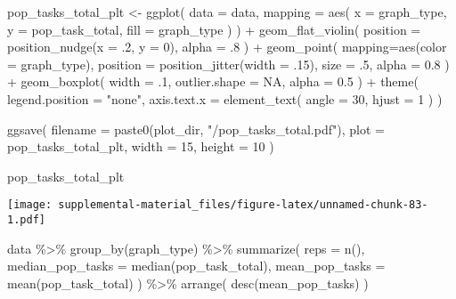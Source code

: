 \documentclass[
]{book}
\newenvironment{Shaded}{\begin{snugshade}}{\end{snugshade}}
\newcommand{\AttributeTok}[1]{\textcolor[rgb]{0.77,0.63,0.00}{#1}}
\newcommand{\ConstantTok}[1]{\textcolor[rgb]{0.00,0.00,0.00}{#1}}
\newcommand{\DecValTok}[1]{\textcolor[rgb]{0.00,0.00,0.81}{#1}}
\newcommand{\FloatTok}[1]{\textcolor[rgb]{0.00,0.00,0.81}{#1}}
\newcommand{\FunctionTok}[1]{\textcolor[rgb]{0.00,0.00,0.00}{#1}}
\newcommand{\NormalTok}[1]{#1}
\newcommand{\OtherTok}[1]{\textcolor[rgb]{0.56,0.35,0.01}{#1}}
\newcommand{\SpecialCharTok}[1]{\textcolor[rgb]{0.00,0.00,0.00}{#1}}
\newcommand{\StringTok}[1]{\textcolor[rgb]{0.31,0.60,0.02}{#1}}
\begin{document}
\begin{Shaded}
\begin{Highlighting}[]
\NormalTok{pop\_tasks\_total\_plt }\OtherTok{\textless{}{-}} \FunctionTok{ggplot}\NormalTok{(}
  \AttributeTok{data =}\NormalTok{ data,}
  \AttributeTok{mapping =} \FunctionTok{aes}\NormalTok{(}
    \AttributeTok{x =}\NormalTok{ graph\_type,}
    \AttributeTok{y =}\NormalTok{ pop\_task\_total,}
    \AttributeTok{fill =}\NormalTok{ graph\_type}
\NormalTok{  )}
\NormalTok{) }\SpecialCharTok{+}
  \FunctionTok{geom\_flat\_violin}\NormalTok{(}
    \AttributeTok{position =} \FunctionTok{position\_nudge}\NormalTok{(}\AttributeTok{x =}\NormalTok{ .}\DecValTok{2}\NormalTok{, }\AttributeTok{y =} \DecValTok{0}\NormalTok{),}
    \AttributeTok{alpha =}\NormalTok{ .}\DecValTok{8}
\NormalTok{  ) }\SpecialCharTok{+}
  \FunctionTok{geom\_point}\NormalTok{(}
    \AttributeTok{mapping=}\FunctionTok{aes}\NormalTok{(}\AttributeTok{color =}\NormalTok{ graph\_type),}
    \AttributeTok{position =} \FunctionTok{position\_jitter}\NormalTok{(}\AttributeTok{width =}\NormalTok{ .}\DecValTok{15}\NormalTok{),}
    \AttributeTok{size =}\NormalTok{ .}\DecValTok{5}\NormalTok{,}
    \AttributeTok{alpha =} \FloatTok{0.8}
\NormalTok{  ) }\SpecialCharTok{+}
  \FunctionTok{geom\_boxplot}\NormalTok{(}
    \AttributeTok{width =}\NormalTok{ .}\DecValTok{1}\NormalTok{,}
    \AttributeTok{outlier.shape =} \ConstantTok{NA}\NormalTok{,}
    \AttributeTok{alpha =} \FloatTok{0.5}
\NormalTok{  ) }\SpecialCharTok{+}
  \FunctionTok{theme}\NormalTok{(}
    \AttributeTok{legend.position =} \StringTok{"none"}\NormalTok{,}
    \AttributeTok{axis.text.x =} \FunctionTok{element\_text}\NormalTok{(}
      \AttributeTok{angle =} \DecValTok{30}\NormalTok{,}
      \AttributeTok{hjust =} \DecValTok{1}
\NormalTok{    )}
\NormalTok{  )}

\FunctionTok{ggsave}\NormalTok{(}
  \AttributeTok{filename =} \FunctionTok{paste0}\NormalTok{(plot\_dir, }\StringTok{"/pop\_tasks\_total.pdf"}\NormalTok{),}
  \AttributeTok{plot =}\NormalTok{ pop\_tasks\_total\_plt,}
  \AttributeTok{width =} \DecValTok{15}\NormalTok{,}
  \AttributeTok{height =} \DecValTok{10}
\NormalTok{)}

\NormalTok{pop\_tasks\_total\_plt}
\end{Highlighting}
\end{Shaded}

\texttt{[image: supplemental-material\_files/figure-latex/unnamed-chunk-83-1.pdf]}

\begin{Shaded}
\begin{Highlighting}[]
\NormalTok{data }\SpecialCharTok{\%\textgreater{}\%}
  \FunctionTok{group\_by}\NormalTok{(graph\_type) }\SpecialCharTok{\%\textgreater{}\%}
  \FunctionTok{summarize}\NormalTok{(}
    \AttributeTok{reps =} \FunctionTok{n}\NormalTok{(),}
    \AttributeTok{median\_pop\_tasks =} \FunctionTok{median}\NormalTok{(pop\_task\_total),}
    \AttributeTok{mean\_pop\_tasks =} \FunctionTok{mean}\NormalTok{(pop\_task\_total)}
\NormalTok{  ) }\SpecialCharTok{\%\textgreater{}\%}
  \FunctionTok{arrange}\NormalTok{(}
    \FunctionTok{desc}\NormalTok{(mean\_pop\_tasks)}
\NormalTok{  )}
\end{Highlighting}
\end{Shaded}
\end{document}
